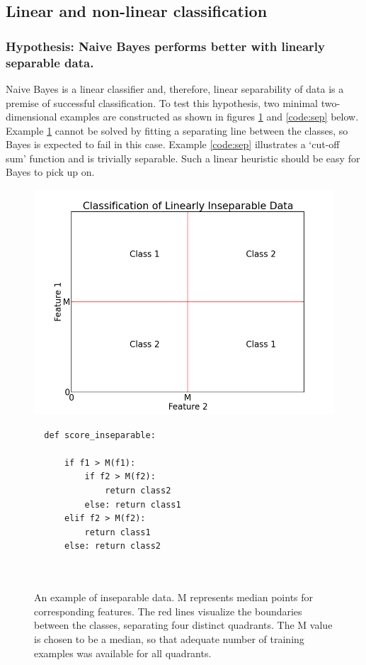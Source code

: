 \documentclass[12pt,notitlepage,twoside]{scrreprt}
\begin{document}
\subsection{Linear and non-linear classification}
\subsubsection*{Hypothesis: Naive Bayes performs better with linearly separable data.}

Naive Bayes is a linear classifier and, therefore, linear separability of data is a
premise of successful classification. To test this hypothesis, two minimal two-dimensional
examples are constructed as shown in figures \ref{code:insep} and \ref{code:sep} below.
Example \ref{code:insep} cannot be solved by fitting a separating line between the
classes, so Bayes is expected to fail in this case. Example \ref{code:sep} illustrates a
`cut-off sum' function and is trivially separable. Such a linear heuristic should be easy
for Bayes to pick up on.

\begin{figure}[h!]
\begin{minipage}[b]{0.55\linewidth}
  \includegraphics[width=1.2\linewidth]{figs/gen_insep.png}
\end{minipage}
\hspace{0.5cm}
\begin{minipage}[b]{0.4\linewidth}
\begin{verbatim}
  def score_inseparable:

      if f1 > M(f1):
          if f2 > M(f2):
              return class2
          else: return class1
      elif f2 > M(f2): 
          return class1
      else: return class2



\end{verbatim}
\end{minipage}
\caption{An example of inseparable data. M represents median points for corresponding
features.  The red lines visualize the boundaries between the classes, separating four
distinct quadrants. The M value is chosen to be a median, so that adequate number of
training examples was available for all quadrants.  \label{code:insep}}
\end{figure}
\end{document}

